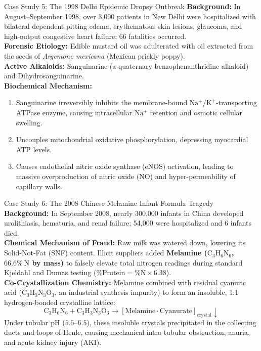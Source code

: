 \documentclass[11pt,a4paper,oneside]{article}
\begin{document}
\begin{casestudybox}{Case Study 5: The 1998 Delhi Epidemic Dropsy Outbreak}
\textbf{Background:} In August--September 1998, over 3,000 patients in New Delhi were hospitalized with bilateral dependent pitting edema, erythematous skin lesions, glaucoma, and high-output congestive heart failure; 66 fatalities occurred.\\
\textbf{Forensic Etiology:} Edible mustard oil was adulterated with oil extracted from the seeds of \textit{Argemone mexicana} (Mexican prickly poppy).\\
\textbf{Active Alkaloids:} Sanguinarine (a quaternary benzophenanthridine alkaloid) and Dihydrosanguinarine.\\
\textbf{Biochemical Mechanism:}
\begin{enumerate}
    \item Sanguinarine irreversibly inhibits the membrane-bound $\mathrm{Na^+/K^+}$-transporting ATPase enzyme, causing intracellular $\mathrm{Na^+}$ retention and osmotic cellular swelling.
    \item Uncouples mitochondrial oxidative phosphorylation, depressing myocardial ATP levels.
    \item Causes endothelial nitric oxide synthase (eNOS) activation, leading to massive overproduction of nitric oxide ($\mathrm{NO}$) and hyper-permeability of capillary walls.
\end{enumerate}
\end{casestudybox}

\begin{casestudybox}{Case Study 6: The 2008 Chinese Melamine Infant Formula Tragedy}
\textbf{Background:} In September 2008, nearly 300,000 infants in China developed urolithiasis, hematuria, and renal failure; 54,000 were hospitalized and 6 infants died.\\
\textbf{Chemical Mechanism of Fraud:} Raw milk was watered down, lowering its Solid-Not-Fat (SNF) content. Illicit suppliers added \textbf{Melamine ($\mathrm{C_3H_6N_6}$, $66.6\%\ \mathrm{N}$ by mass)} to falsely elevate total nitrogen readings during standard Kjeldahl and Dumas testing ($\% \text{Protein} = \% \text{N} \times 6.38$).\\
\textbf{Co-Crystallization Chemistry:} Melamine combined with residual cyanuric acid ($\mathrm{C_3H_3N_3O_3}$, an industrial synthesis impurity) to form an insoluble, 1:1 hydrogen-bonded crystalline lattice:
$$\mathrm{C_3H_6N_6 + C_3H_3N_3O_3 \longrightarrow [Melamine \cdot Cyanurate]_{crystal} \downarrow}$$
Under tubular pH ($5.5\text{--}6.5$), these insoluble crystals precipitated in the collecting ducts and loops of Henle, causing mechanical intra-tubular obstruction, anuria, and acute kidney injury (AKI).
\end{casestudybox}
\end{document}
